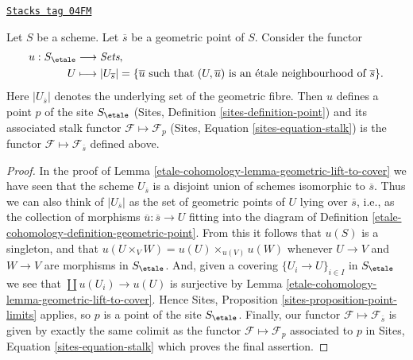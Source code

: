 \begin{lemma}
\label{etale-cohomology-lemma-stalk-gives-point}
\href{https://stacks.math.columbia.edu/tag/04FM}{\texttt{Stacks tag 04FM}}

Let $S$ be a scheme. Let $\overline{s}$ be a geometric point of $S$.
Consider the functor
\begin{align*}
u : S_\etale & \longrightarrow \textit{Sets}, \\
U & \longmapsto
|U_{\overline{s}}|
=
\{\overline{u} \text{ such that }(U, \overline{u})
\text{ is an \'etale neighbourhood of }\overline{s}\}.
\end{align*}
Here $|U_{\overline{s}}|$ denotes the underlying set of the geometric fibre.
Then $u$ defines a point $p$ of the site $S_\etale$
(Sites, Definition \ref{sites-definition-point})
and its associated stalk functor $\mathcal{F} \mapsto \mathcal{F}_p$
(Sites, Equation \ref{sites-equation-stalk})
is the functor $\mathcal{F} \mapsto \mathcal{F}_{\overline{s}}$
defined above.
\end{lemma}

\begin{proof}
In the proof of
Lemma \ref{etale-cohomology-lemma-geometric-lift-to-cover}
we have seen that the scheme $U_{\overline{s}}$ is a disjoint union of
schemes isomorphic to $\overline{s}$. Thus we can also think of
$|U_{\overline{s}}|$ as the set of geometric points of $U$ lying over
$\overline{s}$, i.e., as the collection of morphisms
$\overline{u} : \overline{s} \to U$ fitting into the diagram of
Definition \ref{etale-cohomology-definition-geometric-point}.
From this it follows that $u(S)$ is a singleton, and that
$u(U \times_V W) = u(U) \times_{u(V)} u(W)$
whenever $U \to V$ and $W \to V$ are morphisms in $S_\etale$.
And, given a covering $\{U_i \to U\}_{i \in I}$ in $S_\etale$
we see that $\coprod u(U_i) \to u(U)$ is surjective by
Lemma \ref{etale-cohomology-lemma-geometric-lift-to-cover}.
Hence
Sites, Proposition \ref{sites-proposition-point-limits}
applies, so $p$ is a point of the site $S_\etale$.
Finally, our functor $\mathcal{F} \mapsto \mathcal{F}_{\overline{s}}$
is given by exactly the same colimit as the functor
$\mathcal{F} \mapsto \mathcal{F}_p$ associated to $p$ in
Sites, Equation \ref{sites-equation-stalk}
which proves the final assertion.
\end{proof}

